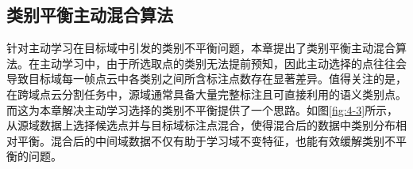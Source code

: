     \subsection{类别平衡主动混合算法}  %
    针对主动学习在目标域中引发的类别不平衡问题，本章提出了类别平衡主动混合算法。在主动学习中，由于所选取点的类别无法提前预知，因此主动选择的点往往会导致目标域每一帧点云中各类别之间所含标注点数存在显著差异。值得关注的是，在跨域点云分割任务中，源域通常具备大量完整标注且可直接利用的语义类别点。而这为本章解决主动学习选择的类别不平衡提供了一个思路。如图\ref{fig:4-3}所示，从源域数据上选择候选点并与目标域标注点混合，使得混合后的数据中类别分布相对平衡。混合后的中间域数据不仅有助于学习域不变特征，也能有效缓解类别不平衡的问题。%


